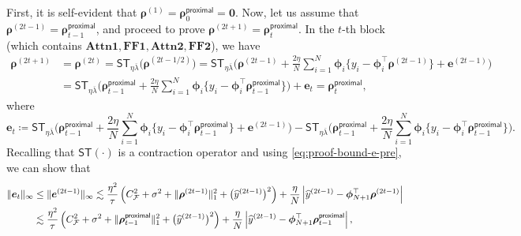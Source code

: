 \documentclass[english]{article}
\begin{document}
First, it is self-evident that ${\bm \rho}^{(1)} = {\bm \rho}_0^{\mathsf{proximal}} = {\bm 0}$.
Now, let us assume that ${\bm \rho}^{(2t-1)} = {\bm \rho}_{t-1}^{\mathsf{proximal}}$, and proceed to prove
${\bm \rho}^{(2t+1)} = {\bm \rho}_t^{\mathsf{proximal}}$.
In the $t$-th block (which contains $\textbf{Attn1},\textbf{FF1},\textbf{Attn2},\textbf{FF2}$), we have
%
\begin{align*}
{\bm \rho}^{(2t+1)} 
&= {\bm \rho}^{(2t)} =\mathsf{ST}_{\eta\overline{\lambda}}\big({\bm \rho}^{(2t-1/2)}\big) = \mathsf{ST}_{\eta\overline{\lambda}}\bigg({\bm \rho}^{(2t-1)}  + \frac{2\eta}{N}\sum_{i = 1}^{N} {\bm \phi}_i\big\{y_i - {\bm \phi}_i^{\top}{\bm \rho}^{(2t-1)}\big\} + {\bm e}^{(2t-1)}\bigg)\nonumber\\
&=\mathsf{ST}_{\eta\overline{\lambda}}\bigg({\bm \rho}_{t-1}^{\mathsf{proximal}}  + \frac{2\eta}{N}\sum_{i = 1}^{N} {\bm \phi}_i\big\{y_i - {\bm \phi}_i^{\top}{\bm \rho}_{t-1}^{\mathsf{proximal}}\big\}\bigg) + {\bm e}_{t} = {\bm \rho}_t^{\mathsf{proximal}},
\end{align*}
where 
$$
{\bm e}_{t} \coloneqq \mathsf{ST}_{\eta\overline{\lambda}}\bigg({\bm \rho}_{t-1}^{\mathsf{proximal}}  + \frac{2\eta}{N}\sum_{i = 1}^{N} {\bm \phi}_i\big\{y_i - {\bm \phi}_i^{\top}{\bm \rho}_{t-1}^{\mathsf{proximal}}\big\}+ {\bm e}^{(2t-1)}\bigg)  - \mathsf{ST}_{\eta\overline{\lambda}}\bigg({\bm \rho}_{t-1}^{\mathsf{proximal}}  + \frac{2\eta}{N}\sum_{i = 1}^{N} {\bm \phi}_i\big\{y_i - {\bm \phi}_i^{\top}{\bm \rho}_{t-1}^{\mathsf{proximal}}\big\}\bigg).
$$
Recalling that $\mathsf{ST}(\cdot)$ is a contraction operator and using \eqref{eq:proof-bound-e-pre}, we can show that
%
\begin{align}\label{eq:proof-bound-e-pre-2}
\|{\bm e}_{t}\|_\infty &\le \|{\bm e}^{(2t-1)}\|_\infty
\lesssim \frac{\eta^2}{\tau}\left(C_{\mathcal{F}}^2 + \sigma^2 + \|{\bm \rho}^{(2t-1)}\|_1^2 + \big(\widehat{y}^{(2t-1)}\big)^2\right)+ \frac{\eta}{N}\left|\widehat{y}^{(2t-1)} - {\bm \phi}_{N+1}^{\top}{\bm \rho}^{(2t-1)}\right|\notag\\
&\lesssim \frac{\eta^2}{\tau}\left(C_{\mathcal{F}}^2 + \sigma^2 + \|{\bm \rho}_{t-1}^{\mathsf{proximal}}\|_1^2 + \big(\widehat{y}^{(2t-1)}\big)^2\right)+ \frac{\eta}{N}\left|\widehat{y}^{(2t-1)} - {\bm \phi}_{N+1}^{\top}{\bm \rho}_{t-1}^{\mathsf{proximal}}\right|,
\end{align}
\end{document}
